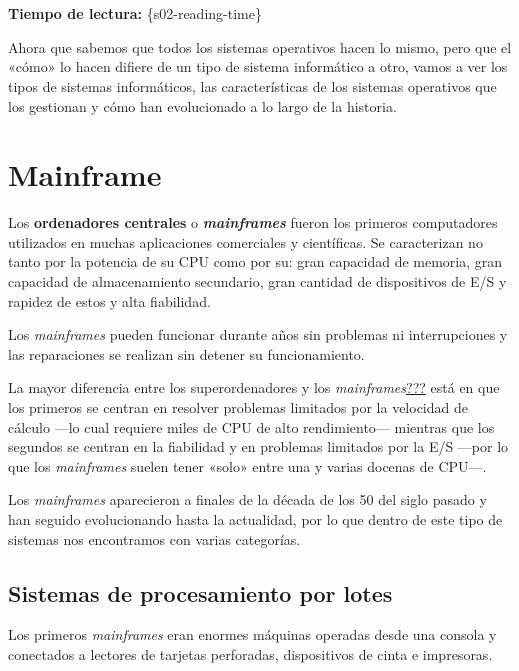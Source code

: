 \section{}

\textbf{Tiempo de lectura:} \{s02-reading-time\}

Ahora que sabemos que todos los sistemas operativos hacen lo mismo, pero
que el «cómo» lo hacen difiere de un tipo de sistema informático a otro,
vamos a ver los tipos de sistemas informáticos, las características de
los sistemas operativos que los gestionan y cómo han evolucionado a lo
largo de la historia.

\section{Mainframe}\label{_mainframe}

Los \textbf{ordenadores centrales} o \emph{\textbf{{}mainframes}} fueron
los primeros computadores utilizados en muchas aplicaciones comerciales
y científicas. Se caracterizan no tanto por la potencia de su CPU como
por su: gran capacidad de memoria, gran capacidad de almacenamiento
secundario, gran cantidad de dispositivos de E/S y rapidez de estos y
alta fiabilidad.

Los \emph{mainframes} pueden funcionar durante años sin problemas ni
interrupciones y las reparaciones se realizan sin detener su
funcionamiento.

La mayor diferencia entre los superordenadores y los
\emph{mainframes}\hyperref[Wikipedia-Mainframe]{???} está en que los
primeros se centran en resolver problemas limitados por la velocidad de
cálculo ---lo cual requiere miles de CPU de alto rendimiento--- mientras
que los segundos se centran en la fiabilidad y en problemas limitados
por la E/S ---por lo que los \emph{mainframes} suelen tener «solo» entre
una y varias docenas de CPU---.

Los \emph{mainframes} aparecieron a finales de la década de los 50 del
siglo pasado y han seguido evolucionando hasta la actualidad, por lo que
dentro de este tipo de sistemas nos encontramos con varias categorías.

\subsection{Sistemas de procesamiento por
lotes}\label{_sistemas_de_procesamiento_por_lotes}

{} {} Los primeros \emph{mainframes} eran enormes máquinas operadas
desde una consola y conectados a lectores de tarjetas perforadas,
dispositivos de cinta e impresoras.

